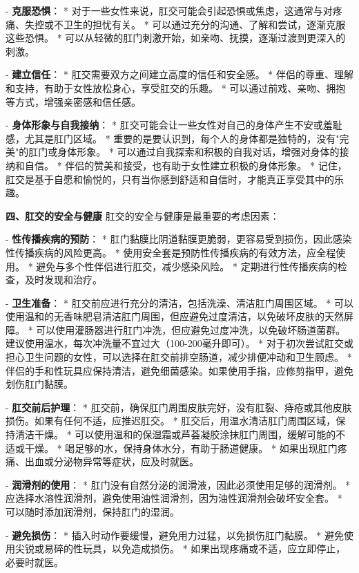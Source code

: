 \begin{enumerate}
  - \textbf{克服恐惧}：
    * 对于一些女性来说，肛交可能会引起恐惧或焦虑，这通常与对疼痛、失控或不卫生的担忧有关。
    * 可以通过充分的沟通、了解和尝试，逐渐克服这些恐惧。
    * 可以从轻微的肛门刺激开始，如亲吻、抚摸，逐渐过渡到更深入的刺激。

  - \textbf{建立信任}：
    * 肛交需要双方之间建立高度的信任和安全感。
    * 伴侣的尊重、理解和支持，有助于女性放松身心，享受肛交的乐趣。
    * 可以通过前戏、亲吻、拥抱等方式，增强亲密感和信任感。

  - \textbf{身体形象与自我接纳}：
    * 肛交可能会让一些女性对自己的身体产生不安或羞耻感，尤其是肛门区域。
    * 重要的是要认识到，每个人的身体都是独特的，没有"完美"的肛门或身体形象。
    * 可以通过自我探索和积极的自我对话，增强对身体的接纳和自信。
    * 伴侣的赞美和接受，也有助于女性建立积极的身体形象。
    * 记住，肛交是基于自愿和愉悦的，只有当你感到舒适和自信时，才能真正享受其中的乐趣。

  \textbf{四、肛交的安全与健康}
  肛交的安全与健康是最重要的考虑因素：

  - \textbf{性传播疾病的预防}：
    * 肛门黏膜比阴道黏膜更脆弱，更容易受到损伤，因此感染性传播疾病的风险更高。
    * 使用安全套是预防性传播疾病的有效方法，应全程使用。
    * 避免与多个性伴侣进行肛交，减少感染风险。
    * 定期进行性传播疾病的检查，及时发现和治疗。

  - \textbf{卫生准备}：
    * 肛交前应进行充分的清洁，包括洗澡、清洁肛门周围区域。
    * 可以使用温和的无香味肥皂清洁肛门周围，但应避免过度清洁，以免破坏皮肤的天然屏障。
    * 可以使用灌肠器进行肛门冲洗，但应避免过度冲洗，以免破坏肠道菌群。建议使用温水，每次冲洗量不宜过大（100-200毫升即可）。
    * 对于初次尝试肛交或担心卫生问题的女性，可以选择在肛交前排空肠道，减少排便冲动和卫生顾虑。
    * 伴侣的手和性玩具应保持清洁，避免细菌感染。如果使用手指，应修剪指甲，避免划伤肛门黏膜。

  - \textbf{肛交前后护理}：
    * 肛交前，确保肛门周围皮肤完好，没有肛裂、痔疮或其他皮肤损伤。如果有任何不适，应推迟肛交。
    * 肛交后，用温水清洁肛门周围区域，保持清洁干燥。
    * 可以使用温和的保湿霜或芦荟凝胶涂抹肛门周围，缓解可能的不适或干燥。
    * 喝足够的水，保持身体水分，有助于肠道健康。
    * 如果出现肛门疼痛、出血或分泌物异常等症状，应及时就医。

  - \textbf{润滑剂的使用}：
    * 肛门没有自然分泌的润滑液，因此必须使用足够的润滑剂。
    * 应选择水溶性润滑剂，避免使用油性润滑剂，因为油性润滑剂会破坏安全套。
    * 可以随时添加润滑剂，保持肛门的湿润。

  - \textbf{避免损伤}：
    * 插入时动作要缓慢，避免用力过猛，以免损伤肛门黏膜。
    * 避免使用尖锐或易碎的性玩具，以免造成损伤。
    * 如果出现疼痛或不适，应立即停止，必要时就医。


\end{enumerate}
